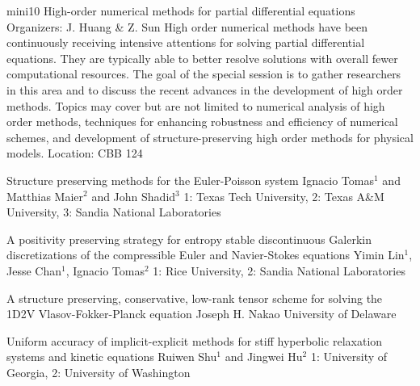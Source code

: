 \mini
{mini10}
{High-order numerical methods for partial differential equations}
{Organizers: J. Huang \& Z. Sun}
{High order numerical methods have been continuously receiving intensive attentions for solving partial differential equations. They are typically able to better resolve solutions with overall fewer computational resources. The goal of the special session is to gather researchers in this area and to discuss the recent advances in the development of high order methods. Topics may cover but are not limited to numerical analysis of high order methods, techniques for enhancing robustness and efficiency of numerical schemes, and development of structure-preserving high order methods for physical models.}
{Location: CBB 124}

\begin{talks}
\item\talk
{Structure preserving methods for the Euler-Poisson system}
{Ignacio Tomas$^{1}$ and Matthias Maier$^{2}$ and John Shadid$^{3}$}
{1: Texas Tech University, 2: Texas A\&M University, 3: Sandia National Laboratories}
\item\talk
{A positivity preserving strategy for entropy stable discontinuous Galerkin discretizations of the compressible Euler and Navier-Stokes equations}
{Yimin Lin$^{1}$, Jesse Chan$^{1}$, Ignacio Tomas$^{2}$}
{1: Rice University, 2: Sandia National Laboratories}
\item\talk
{A structure preserving, conservative, low-rank tensor scheme for solving the 1D2V Vlasov-Fokker-Planck equation}
{Joseph H. Nakao}
{University of Delaware}
\item\talk
{Uniform accuracy of implicit-explicit methods for stiff hyperbolic relaxation systems and kinetic equations}
{Ruiwen Shu$^{1}$ and Jingwei Hu$^{2}$}
{1: University of Georgia, 2: University of Washington}
\end{talks}
\room

